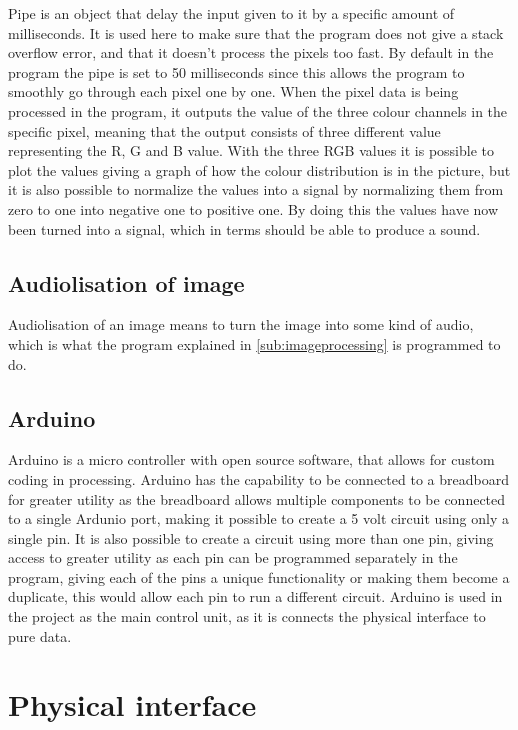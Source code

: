 	Pipe is an object that delay the input given to it by a specific amount of milliseconds. It is used here to make sure that the program does not give a stack overflow error, and that it doesn't process the pixels too fast. By default in the program the pipe is set to 50 milliseconds since this allows the program to smoothly go through each pixel one by one. 
	When the pixel data is being processed in the program, it outputs the value of the three colour channels in the specific pixel, meaning that the output consists of three different value representing the R, G and B value. With the three RGB values it is possible to plot the values giving a graph of how the colour distribution is in the picture, but it is also possible to normalize the values into a signal by normalizing them from zero to one into negative one to positive one. By doing this the values have now been turned into a signal, which in terms should be able to produce a sound.

	\subsection{Audiolisation of image}\label{sub:audiolisationofimage} 
	Audiolisation of an image means to turn the image into some kind of audio, which is what the program explained in \ref{sub:imageprocessing} is programmed to do. 
	
	\subsection{Arduino}\label{sub:arduino}
	Arduino is a micro controller with open source software, that allows for custom coding in processing. Arduino has the capability to be connected to a breadboard for greater utility as the breadboard allows multiple components to be connected to a single Ardunio port, making it possible to create a 5 volt circuit using only a single pin. It is also possible to create a circuit using more than one pin, giving access to greater utility as each pin can be programmed separately in the program, giving each of the pins a unique functionality or making them become a duplicate, this would allow each pin to run a different circuit.
	Arduino is used in the project as the main control unit, as it is connects the physical interface to pure data. 
	
\section{Physical interface}\label{sec:physicalinterface}

